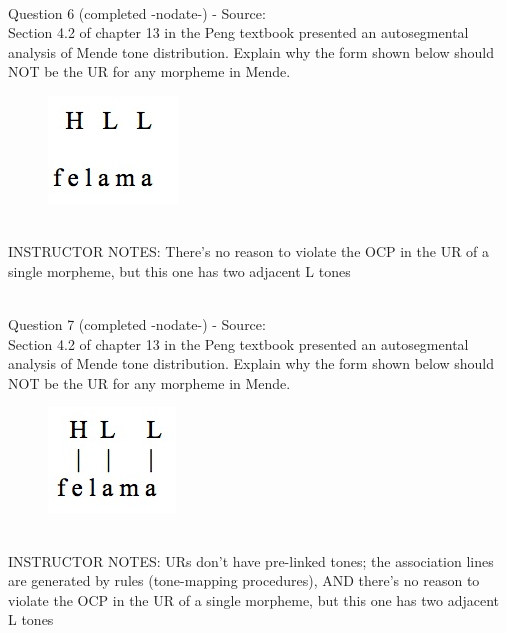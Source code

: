 \documentclass[12pt]{article}
\begin{document}
~\\

{\large Question 6} (completed -nodate-) - Source: \\

Section 4.2 of chapter 13 in the Peng textbook presented an autosegmental analysis of Mende tone distribution. Explain why the form shown below should NOT be the UR for any morpheme in Mende.\\

\begin{figure}[H]
\includegraphics{../images/mende_junction_b.png}
\end{figure}

~\\
INSTRUCTOR NOTES: There's no reason to violate the OCP in the UR of a single morpheme, but this one has two adjacent L tones


~\\

{\large Question 7} (completed -nodate-) - Source: \\

Section 4.2 of chapter 13 in the Peng textbook presented an autosegmental analysis of Mende tone distribution. Explain why the form shown below should NOT be the UR for any morpheme in Mende.\\

\begin{figure}[H]
\includegraphics{../images/mende_junction_c.png}
\end{figure}

~\\
INSTRUCTOR NOTES: URs don't have pre-linked tones; the association lines are generated by rules (tone-mapping procedures), AND there's no reason to violate the OCP in the UR of a single morpheme, but this one has two adjacent L tones


~\\
\end{document}
